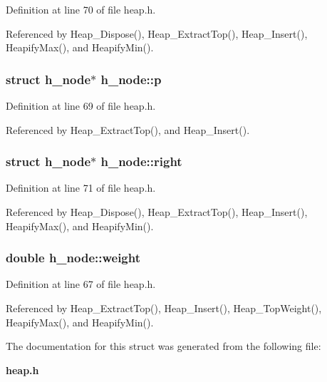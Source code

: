 Definition at line 70 of file heap.h.

Referenced by Heap\_\-Dispose(), Heap\_\-Extract\-Top(), Heap\_\-Insert(), Heapify\-Max(), and Heapify\-Min().
\subsubsection{\setlength{\rightskip}{0pt plus 5cm}struct \bf{h\_\-node}$\ast$ \bf{h\_\-node::p}}\label{structh__node_14699a1dce1ea32b889865e742774892}




Definition at line 69 of file heap.h.

Referenced by Heap\_\-Extract\-Top(), and Heap\_\-Insert().
\subsubsection{\setlength{\rightskip}{0pt plus 5cm}struct \bf{h\_\-node}$\ast$ \bf{h\_\-node::right}}\label{structh__node_2bc8bfb676371447c6521924a4346637}




Definition at line 71 of file heap.h.

Referenced by Heap\_\-Dispose(), Heap\_\-Extract\-Top(), Heap\_\-Insert(), Heapify\-Max(), and Heapify\-Min().
\subsubsection{\setlength{\rightskip}{0pt plus 5cm}double \bf{h\_\-node::weight}}\label{structh__node_5d429c6395d4d057fc187993a9ffef53}




Definition at line 67 of file heap.h.

Referenced by Heap\_\-Extract\-Top(), Heap\_\-Insert(), Heap\_\-Top\-Weight(), Heapify\-Max(), and Heapify\-Min().

The documentation for this struct was generated from the following file:\begin{CompactItemize}
\item 
\bf{heap.h}\end{CompactItemize}
